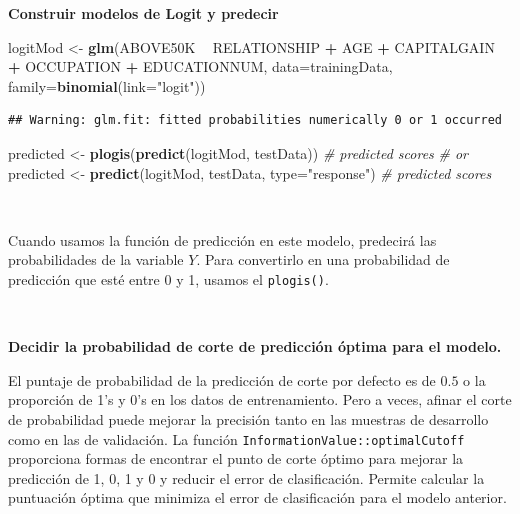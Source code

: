 \documentclass[]{book}
\newenvironment{Shaded}{\begin{snugshade}}{\end{snugshade}}
\newcommand{\KeywordTok}[1]{\textcolor[rgb]{0.13,0.29,0.53}{\textbf{#1}}}
\newcommand{\DataTypeTok}[1]{\textcolor[rgb]{0.13,0.29,0.53}{#1}}
\newcommand{\StringTok}[1]{\textcolor[rgb]{0.31,0.60,0.02}{#1}}
\newcommand{\CommentTok}[1]{\textcolor[rgb]{0.56,0.35,0.01}{\textit{#1}}}
\newcommand{\OperatorTok}[1]{\textcolor[rgb]{0.81,0.36,0.00}{\textbf{#1}}}
\newcommand{\NormalTok}[1]{#1}
\begin{document}
\textbf{Construir modelos de Logit y predecir}

\begin{Shaded}
\begin{Highlighting}[]
\NormalTok{logitMod <-}\StringTok{ }\KeywordTok{glm}\NormalTok{(ABOVE50K }\OperatorTok{~}\StringTok{ }\NormalTok{RELATIONSHIP }\OperatorTok{+}\StringTok{ }\NormalTok{AGE }\OperatorTok{+}\StringTok{ }\NormalTok{CAPITALGAIN }\OperatorTok{+}\StringTok{ }\NormalTok{OCCUPATION }\OperatorTok{+}\StringTok{ }\NormalTok{EDUCATIONNUM, }\DataTypeTok{data=}\NormalTok{trainingData, }\DataTypeTok{family=}\KeywordTok{binomial}\NormalTok{(}\DataTypeTok{link=}\StringTok{"logit"}\NormalTok{))}
\end{Highlighting}
\end{Shaded}

\begin{verbatim}
## Warning: glm.fit: fitted probabilities numerically 0 or 1 occurred
\end{verbatim}

\begin{Shaded}
\begin{Highlighting}[]
\NormalTok{predicted <-}\StringTok{ }\KeywordTok{plogis}\NormalTok{(}\KeywordTok{predict}\NormalTok{(logitMod, testData))  }\CommentTok{# predicted scores}
\CommentTok{# or}
\NormalTok{predicted <-}\StringTok{ }\KeywordTok{predict}\NormalTok{(logitMod, testData, }\DataTypeTok{type=}\StringTok{"response"}\NormalTok{)  }\CommentTok{# predicted scores}
\end{Highlighting}
\end{Shaded}

~

Cuando usamos la función de predicción en este modelo, predecirá las
probabilidades de la variable \(Y\). Para convertirlo en una
probabilidad de predicción que esté entre 0 y 1, usamos el
\texttt{plogis()}.

~

\textbf{Decidir la probabilidad de corte de predicción óptima para el
modelo.}

El puntaje de probabilidad de la predicción de corte por defecto es de
\(0.5\) o la proporción de 1's y 0's en los datos de entrenamiento. Pero
a veces, afinar el corte de probabilidad puede mejorar la precisión
tanto en las muestras de desarrollo como en las de validación. La
función \texttt{InformationValue::optimalCutoff} proporciona formas de
encontrar el punto de corte óptimo para mejorar la predicción de 1, 0, 1
y 0 y reducir el error de clasificación. Permite calcular la puntuación
óptima que minimiza el error de clasificación para el modelo anterior.
\end{document}
